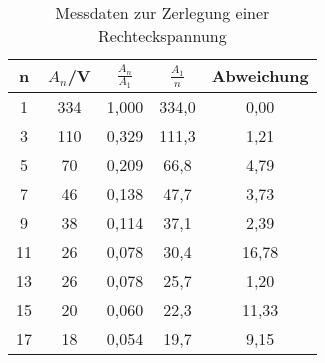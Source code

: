 
\begin{table}[h!]
  \centering
  \caption{Messdaten zur Zerlegung einer Rechteckspannung}
  \label{tab:rechteck}
  \begin{tabular}{c c c c c}
    \toprule
    n & $A_n$/V & $\frac{A_{n}}{A_{1}}$ & $\frac{A_1}{n}$ & Abweichung\\
    \midrule

    1  & 334 & 1,000         & 334,0  & 0,00\\
    3  & 110 & 0,329  & 111,3  & 1,21\\
    5  & 70  & 0,209  & 66,8   & 4,79\\
    7  & 46  & 0,138  & 47,7   & 3,73\\
    9  & 38  & 0,114  & 37,1   & 2,39\\
    11 & 26  & 0,078  & 30,4   & 16,78\\
    13 & 26  & 0,078  & 25,7   & 1,20\\
    15 & 20  & 0,060  & 22,3   & 11,33\\
    17 & 18  & 0,054  & 19,7   & 9,15\\






























    \bottomrule
  \end{tabular}
\end{table}
